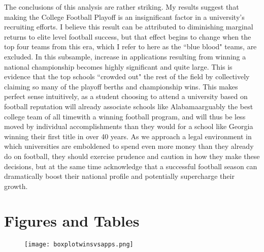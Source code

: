 \documentclass[12pt,english]{article}
\begin{document}
The conclusions of this analysis are rather striking. My results suggest that making the College Football Playoff is an insignificant factor in a university's recruiting efforts. I believe this result can be attributed to diminishing marginal returns to elite level football success, but that effect begins to change when the top four teams from this era, which I refer to here as the ``blue blood" teams, are excluded. In this subsample, increase in applications resulting from winning a national championship becomes highly significant and quite large. This is evidence that the top schools ``crowded out" the rest of the field by collectively claiming so many of the playoff berths and championship wins. This makes perfect sense intuitively, as a student choosing to attend a university based on football reputation will already associate schools like Alabama\textemdash arguably the best college team of all time\textemdash with a winning football program, and will thus be less moved by individual accomplishments than they would for a school like Georgia winning their first title in over 40 years. As we approach a legal environment in which universities are emboldened to spend even more money than they already do on football, they should exercise prudence and caution in how they make these decisions, but at the same time acknowledge that a successful football season can dramatically boost their national profile and potentially supercharge their growth.


\vfill
\pagebreak{}
\begin{spacing}{1.0}


\end{spacing}

\section*{Figures and Tables}

\begin{figure}
    \centering
    \texttt{[image: boxplotwinsvsapps.png]}
    \label{fig:winapps}
\end{figure}
\end{document}
